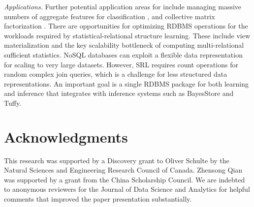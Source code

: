 {\em Applications.} 
Further potential application areas for \FB  include managing massive numbers of aggregate features for classification \cite{Popescul2007}, and collective matrix factorization \cite{Singh2008,Singh2013}. 
There are opportunities for optimizing RDBMS operations for the workloads required by statistical-relational structure learning. These include view materialization and the key scalability bottleneck of computing multi-relational sufficient statistics. NoSQL databases can exploit a flexible data representation for scaling to very large datasets. However, SRL requires count operations for random complex join queries, which is a challenge for less structured data representations. An important goal is a single RDBMS package for both learning and inference that integrates \FB  with inference systems such as BayesStore and Tuffy. 
%


\section{Acknowledgments}
%
This research was supported by a Discovery grant to Oliver Schulte by the Natural Sciences and Engineering Research Council of Canada. 
Zhensong Qian was supported by a grant from the China Scholarship Council. We are indebted to anonymous reviewers for the Journal of Data Science and Analytics for helpful comments that improved the paper presentation substantially.
 
